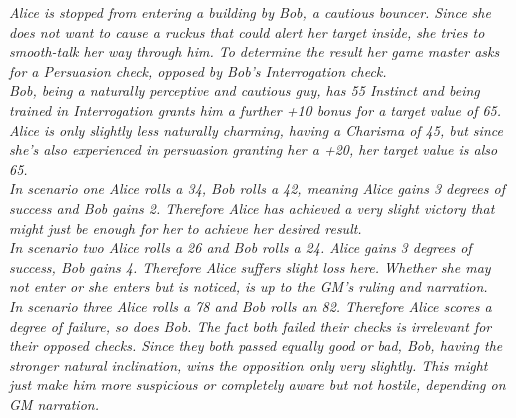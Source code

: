\documentclass[12pt,a4paper,openany]{book}
\newenvironment{exampleblock}[1][1]
{\hfill\begin{minipage}{\dimexpr\textwidth-#1cm}}
{\end{minipage}\par}
\begin{document}
	\begin{exampleblock}\textit{
	Alice is stopped from entering a building by Bob, a cautious bouncer. Since she does not want to cause a ruckus that could alert her target inside, she tries to smooth-talk her way through him. To determine the result her game master asks for a Persuasion check, opposed by Bob’s Interrogation check.\\
	Bob, being a naturally perceptive and cautious guy, has 55 Instinct and being trained in Interrogation grants him a further +10 bonus for a target value of 65. Alice is only slightly less naturally charming, having a Charisma of 45, but since she’s also experienced in persuasion granting her a +20, her target value is also 65.\\
	In scenario one Alice rolls a 34, Bob rolls a 42, meaning Alice gains 3 degrees of success and Bob gains 2. Therefore Alice has achieved a very slight victory that might just be enough for her to achieve her desired result.\\
	In scenario two Alice rolls a 26 and Bob rolls a 24. Alice gains 3 degrees of success, Bob gains 4. Therefore Alice suffers slight loss here. Whether she may not enter or she enters but is noticed, is up to the GM’s ruling and narration.\\
	In scenario three Alice rolls a 78 and Bob rolls an 82. Therefore Alice scores a degree of failure, so does Bob. The fact both failed their checks is irrelevant for their opposed checks. Since they both passed equally good or bad, Bob, having the stronger natural inclination, wins the opposition only very slightly. This might just make him more suspicious or completely aware but not hostile, depending on GM narration.\\
		}
	\end{exampleblock}
\end{document}
